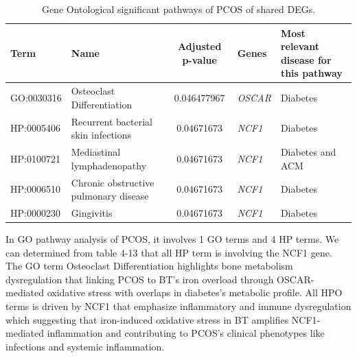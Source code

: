 \begin{table}[H]
\centering
\caption{Gene Ontological significant pathways of PCOS of shared DEGs.}
\renewcommand{\arraystretch}{1.0} %
\small
\begin{tabularx}{\textwidth}{|l|X|c|X|X|}
\hline
\textbf{Term} & \textbf{Name} & \textbf{Adjusted p-value} & \textbf{Genes} & \textbf{Most relevant disease for this pathway} \\
\hline
GO:0030316 & Osteoclast Differentiation & 0.046477967 & \textit{OSCAR} & Diabetes \\
\hline
HP:0005406 & Recurrent bacterial skin infections & 0.04671673 & \textit{NCF1} & Diabetes \\
\hline
HP:0100721 & Mediastinal lymphadenopathy & 0.04671673 & \textit{NCF1} & Diabetes and ACM \\
\hline
HP:0006510 & Chronic obstructive pulmonary disease & 0.04671673 & \textit{NCF1} & Diabetes \\
\hline
HP:0000230 & Gingivitis & 0.04671673 & \textit{NCF1} & Diabetes \\
\hline
\end{tabularx}
\end{table}

In GO pathway analysis of PCOS, it involves 1 GO terms and 4 HP terms. We can determined from table 4-13 that all HP term is involving the NCF1 gene. The GO term Osteoclast Differentiation highlights bone metabolism dysregulation that linking PCOS to BT's iron overload through OSCAR-mediated oxidative stress with overlaps in diabetes's metabolic profile. All HPO terms is driven by NCF1 that emphasize inflammatory and immune dysregulation which suggesting that iron-induced oxidative stress in BT amplifies NCF1-mediated inflammation and contributing to PCOS's clinical phenotypes like infections and systemic inflammation.

